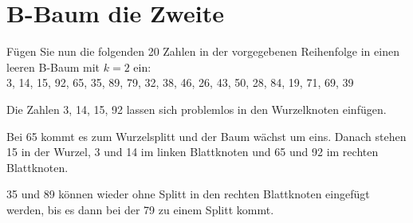 \section{B-Baum die Zweite}
Fügen Sie nun die folgenden 20 Zahlen in der vorgegebenen Reihenfolge in einen leeren B-Baum mit \( k=2 \) ein:\\
3, 14, 15, 92, 65, 35, 89, 79, 32, 38, 46, 26, 43, 50, 28, 84, 19, 71, 69, 39

\begin{note}
	Die Zahlen 3, 14, 15, 92 lassen sich problemlos in den Wurzelknoten einfügen.
	\begin{center}
	\end{center}

Bei 65 kommt es zum Wurzelsplitt und der Baum wächst um eins.
Danach stehen 15 in der Wurzel, 3 und 14 im linken Blattknoten und 65 und 92 im rechten Blattknoten.

	\begin{center}
	\end{center}

35 und 89 können wieder ohne Splitt in den rechten Blattknoten eingefügt werden, bis es dann bei der 79 zu einem Splitt kommt.

	\begin{center}
\end{center}
\end{note}

